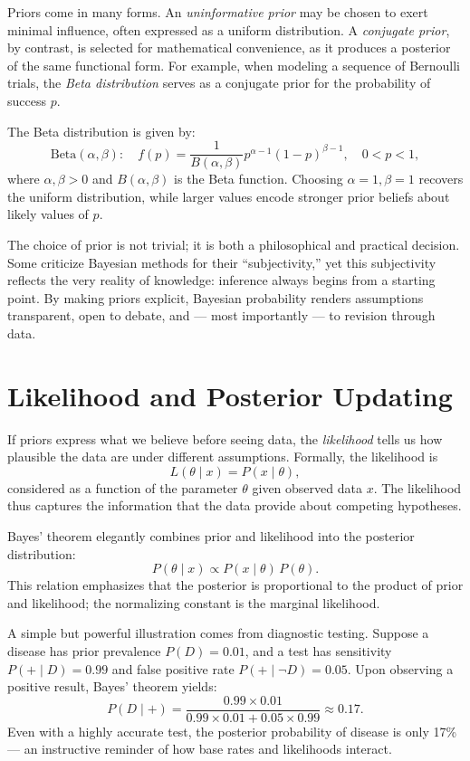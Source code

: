 \documentclass{book}
\begin{document}
Priors come in many forms. An \textit{uninformative prior} may be chosen to exert minimal influence, often expressed as a uniform distribution. A \textit{conjugate prior}, by contrast, is selected for mathematical convenience, as it produces a posterior of the same functional form. For example, when modeling a sequence of Bernoulli trials, the \textit{Beta distribution} serves as a conjugate prior for the probability of success $p$.

The Beta distribution is given by:
\[
\text{Beta}(\alpha, \beta): \quad f(p) = \frac{1}{B(\alpha, \beta)} p^{\alpha-1}(1-p)^{\beta-1}, \quad 0 < p < 1,
\]
where $\alpha, \beta > 0$ and $B(\alpha,\beta)$ is the Beta function. Choosing $\alpha = 1, \beta = 1$ recovers the uniform distribution, while larger values encode stronger prior beliefs about likely values of $p$.

The choice of prior is not trivial; it is both a philosophical and practical decision. Some criticize Bayesian methods for their ``subjectivity,'' yet this subjectivity reflects the very reality of knowledge: inference always begins from a starting point. By making priors explicit, Bayesian probability renders assumptions transparent, open to debate, and --- most importantly --- to revision through data.

\section{Likelihood and Posterior Updating}

If priors express what we believe before seeing data, the \textit{likelihood} tells us how plausible the data are under different assumptions. Formally, the likelihood is
\[
L(\theta \mid x) = P(x \mid \theta),
\]
considered as a function of the parameter $\theta$ given observed data $x$. The likelihood thus captures the information that the data provide about competing hypotheses.

Bayes’ theorem elegantly combines prior and likelihood into the posterior distribution:
\[
P(\theta \mid x) \propto P(x \mid \theta) \, P(\theta).
\]
This relation emphasizes that the posterior is proportional to the product of prior and likelihood; the normalizing constant is the marginal likelihood.

A simple but powerful illustration comes from diagnostic testing. Suppose a disease has prior prevalence $P(D) = 0.01$, and a test has sensitivity $P(+ \mid D) = 0.99$ and false positive rate $P(+ \mid \neg D) = 0.05$. Upon observing a positive result, Bayes’ theorem yields:
\[
P(D \mid +) = \frac{0.99 \times 0.01}{0.99 \times 0.01 + 0.05 \times 0.99} \approx 0.17 .
\]
Even with a highly accurate test, the posterior probability of disease is only 17\% --- an instructive reminder of how base rates and likelihoods interact.
\end{document}
